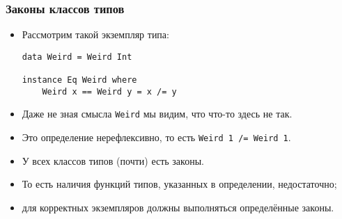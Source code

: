 \documentclass[10pt]{beamer}
\begin{document}


\begin{frame}[fragile]
  \frametitle{Законы классов типов}
  \begin{itemize}
    \item Рассмотрим такой экземпляр типа:
          \begin{lstlisting}
data Weird = Weird Int

instance Eq Weird where
    Weird x == Weird y = x /= y
\end{lstlisting}
    \item Даже не зная смысла \lstinline|Weird| мы видим, что что-то здесь не так. \pause
    \item Это определение нерефлексивно, то есть \lstinline|Weird 1 /= Weird 1|.
    \item У всех классов типов (почти) есть законы.
    \item То есть наличия функций типов, указанных в определении, недостаточно;
    \item для корректных экземпляров должны выполняться определённые законы.
  \end{itemize}
\end{frame}
\end{document}
